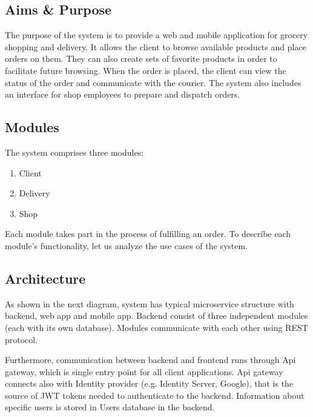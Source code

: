 \documentclass[../main.tex]{subfiles}
\begin{document}
\subsection{Aims \& Purpose}
The purpose of the system is to provide a web and mobile application for grocery shopping and delivery. It allows the client to browse available products and place orders on them. They can also create sets of favorite products in order to facilitate future browsing. When the order is placed, the client can view the status of the order and communicate with the courier. The system also includes an interface for shop employees to prepare and dispatch orders.

\subsection{Modules}
The system comprises three modules:
\begin{enumerate}
    \item Client %
    \item Delivery %
    \item Shop %
\end{enumerate}

Each module takes part in the process of fulfilling an order. To describe each module's functionality, let us analyze the use cases of the system.

\subsection{Architecture}



As shown in the next diagram, system has typical microservice structure with backend, web app and mobile app. Backend consist of three independent modules (each with its own database). Modules communicate with each other using REST protocol.

Furthermore, communication between backend and frontend runs through Api gateway, which is single entry point for all client applications. Api gateway connects also with Identity provider (e.g. Identity Server, Google), that is the source of JWT tokens needed to authenticate to the backend. Information about specific users is stored in Users database in the backend.
\end{document}
